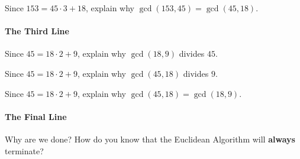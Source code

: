 \documentclass{ximera}
\begin{document}
\begin{problem}
Since $153 = 45\cdot 3 + 18$, explain why $\gcd(153,45) = \gcd(45,18)$.
\end{problem}


\paragraph{The Third Line}
\begin{problem}
Since $45 = 18\cdot 2 + 9$, explain why $\gcd(18,9)$ divides $45$.
\end{problem}

\begin{problem}
Since $45 = 18\cdot 2 + 9$, explain why $\gcd(45,18)$ divides $9$.
\end{problem}

\begin{problem}
Since $45 = 18\cdot 2 + 9$, explain why $\gcd(45,18) = \gcd(18,9)$.
\end{problem}


\paragraph{The Final Line}

\begin{problem}
Why are we done? How do you know that the Euclidean Algorithm
will \textbf{always} terminate?
\end{problem}

\end{document}
